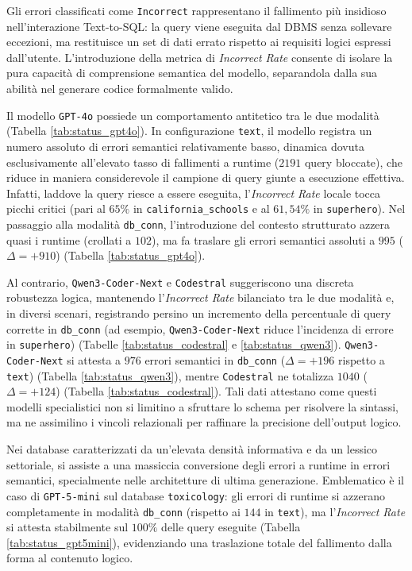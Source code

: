 Gli errori classificati come \texttt{Incorrect} rappresentano il
fallimento più insidioso nell'interazione Text-to-SQL: la query viene
eseguita dal DBMS senza sollevare eccezioni, ma restituisce un set di
dati errato rispetto ai requisiti logici espressi dall'utente.
L'introduzione della metrica di \emph{Incorrect Rate} consente di
isolare la pura capacità di comprensione semantica del modello,
separandola dalla sua abilità nel generare codice formalmente valido.

Il modello \texttt{GPT-4o} possiede un comportamento antitetico tra le due
modalità (Tabella \ref{tab:status_gpt4o}). In configurazione \texttt{text}, il modello
registra un numero assoluto di errori semantici relativamente basso,
dinamica dovuta esclusivamente all'elevato tasso di fallimenti a runtime
(\(2191\) query bloccate), che riduce in maniera considerevole il campione di query
giunte a esecuzione effettiva. Infatti, laddove la query riesce a essere
eseguita, l'\emph{Incorrect Rate} locale tocca picchi critici (pari al
\(65\%\) in \texttt{california\_schools} e al \(61,54\%\) in
\texttt{superhero}). Nel passaggio alla modalità \texttt{db\_conn},
l'introduzione del contesto strutturato azzera quasi i runtime (crollati
a \(102\)), ma fa traslare gli errori semantici assoluti a \(995\)
(\(\Delta = +910\)) (Tabella \ref{tab:status_gpt4o}).

Al contrario, \texttt{Qwen3-Coder-Next} e \texttt{Codestral} suggeriscono
una discreta robustezza logica, mantenendo l'\emph{Incorrect Rate}
bilanciato tra le due modalità e, in diversi scenari, registrando
persino un incremento della percentuale di query corrette in
\texttt{db\_conn} (ad esempio, \texttt{Qwen3-Coder-Next} riduce
l'incidenza di errore in \texttt{superhero}) (Tabelle \ref{tab:status_codestral} e \ref{tab:status_qwen3}).
\texttt{Qwen3-Coder-Next} si attesta a \(976\) errori semantici in
\texttt{db\_conn} (\(\Delta = +196\) rispetto a \texttt{text}) (Tabella
\ref{tab:status_qwen3}), mentre \texttt{Codestral} ne totalizza \(1040\)
(\(\Delta = +124\)) (Tabella \ref{tab:status_codestral}). Tali dati attestano come questi
modelli specialistici non si limitino a sfruttare lo schema per
risolvere la sintassi, ma ne assimilino i vincoli relazionali per
raffinare la precisione dell'output logico.

Nei database caratterizzati da un'elevata densità informativa e da un
lessico settoriale, si assiste a una massiccia conversione degli errori
a runtime in errori semantici, specialmente nelle architetture di ultima
generazione. Emblematico è il caso di \texttt{GPT-5-mini} sul database
\texttt{toxicology}: gli errori di runtime si azzerano completamente in
modalità \texttt{db\_conn} (rispetto ai \(144\) in \texttt{text}), ma
l'\emph{Incorrect Rate} si attesta stabilmente sul \(100\%\) delle query
eseguite (Tabella \ref{tab:status_gpt5mini}), evidenziando una traslazione totale del
fallimento dalla forma al contenuto logico.

